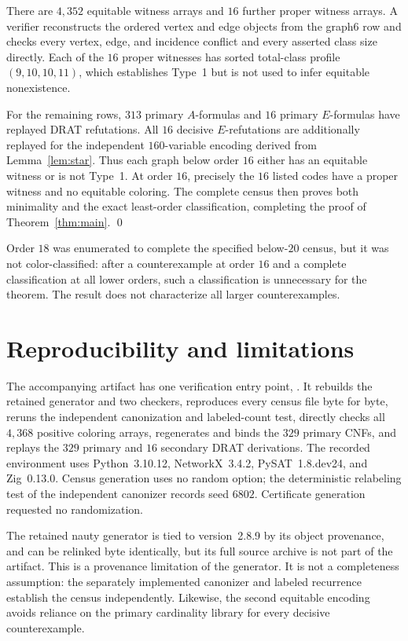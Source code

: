 \documentclass[11pt]{article}
\begin{document}
There are \(4{,}352\) equitable witness arrays and \(16\) further proper
witness arrays.  A verifier reconstructs the ordered vertex and edge
objects from the graph6 row and checks every vertex, edge, and incidence
conflict and every asserted class size directly.  Each of the \(16\)
proper witnesses has sorted total-class profile \((9,10,10,11)\), which
establishes Type~1 but is not used to infer equitable nonexistence.

For the remaining rows, \(313\) primary \(A\)-formulas and \(16\) primary
\(E\)-formulas have replayed DRAT refutations.  All \(16\) decisive
\(E\)-refutations are additionally replayed for the independent
\(160\)-variable encoding derived from Lemma~\ref{lem:star}.  Thus each
graph below order \(16\) either has an equitable witness or is not Type~1.
At order \(16\), precisely the \(16\) listed codes have a proper witness
and no equitable coloring.  The complete census then proves both
minimality and the exact least-order classification, completing the proof
of Theorem~\ref{thm:main}. \qed

Order \(18\) was enumerated to complete the specified below-\(20\)
census, but it was not color-classified: after a counterexample at order
\(16\) and a complete classification at all lower orders, such a
classification is unnecessary for the theorem.  The result does not
characterize all larger counterexamples.

\section{Reproducibility and limitations}

The accompanying artifact has one verification entry point,
.  It rebuilds the retained
generator and two checkers, reproduces every census file byte for byte,
reruns the independent canonization and labeled-count test, directly
checks all \(4{,}368\) positive coloring arrays, regenerates and binds the
\(329\) primary CNFs, and replays the \(329\) primary and \(16\) secondary
DRAT derivations.  The recorded environment uses Python~3.10.12,
NetworkX~3.4.2, PySAT~1.8.dev24, and Zig~0.13.0.  Census generation uses
no random option; the deterministic relabeling test of the independent
canonizer records seed \(6802\).  Certificate generation requested no
randomization.

The retained nauty generator is tied to version~2.8.9 by its object
provenance, and can be relinked byte identically, but its full source
archive is not part of the artifact.  This is a provenance limitation of
the generator.  It is not a completeness assumption: the separately
implemented canonizer and labeled recurrence establish the census
independently.  Likewise, the second equitable encoding avoids reliance
on the primary cardinality library for every decisive counterexample.
\end{document}
